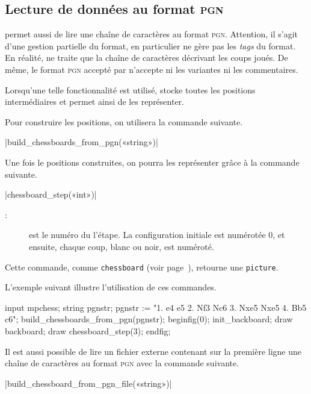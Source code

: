 \documentclass[french]{ltxdoc}
\begin{document}
  
\subsection{Lecture de données au format \textsc{pgn}}

\mpchess permet aussi de lire une chaîne de caractères au format \textsc{pgn}.
Attention, il s’agit d’une gestion partielle du format, en particulier
\mpchess ne gère pas les \emph{tags} du format. En réalité, \mpchess ne traite
que la chaîne de caractères décrivant les coups joués. De même, le format
\textsc{pgn} accepté par \mpchess n’accepte ni les variantes ni les
commentaires.  

Lorsqu’une telle fonctionnalité est utilisé, \mpchess stocke toutes les
positions intermédiaires et permet ainsi de les représenter.

Pour construire les positions, on utilisera la commande suivante.

\commande|build_chessboards_from_pgn(«string»)|\smallskip



Une fois le positions construites, on pourra les représenter grâce à la commande suivante.

\commande|chessboard_step(«int»)|\smallskip
\begin{description}
\item[:] est le numéro du l’étape. La configuration initiale est numérotée 0, et ensuite, chaque coup, blanc ou noir, est numéroté.
\end{description}

Cette commande, comme \lstinline+chessboard+ (voir page~\pageref{com:chessboard}), retourne une \lstinline+picture+.

L’exemple suivant illustre l’utilisation de ces commandes.

\begin{ExempleMP}
input mpchess;
string pgnstr;
pgnstr := "1. e4 e5 2. Nf3 Nc6 3. Nxe5 Nxe5 4. Bb5 c6";
build_chessboards_from_pgn(pgnstr);
beginfig(0);
init_backboard;
draw backboard;
draw chessboard_step(3); %
endfig;
\end{ExempleMP}

Il est aussi possible de lire un fichier externe contenant sur la première ligne
une chaîne de caractères au format \textsc{pgn} avec la commande suivante. 

\commande|build_chessboard_from_pgn_file(«string»)|\smallskip
\end{document}
